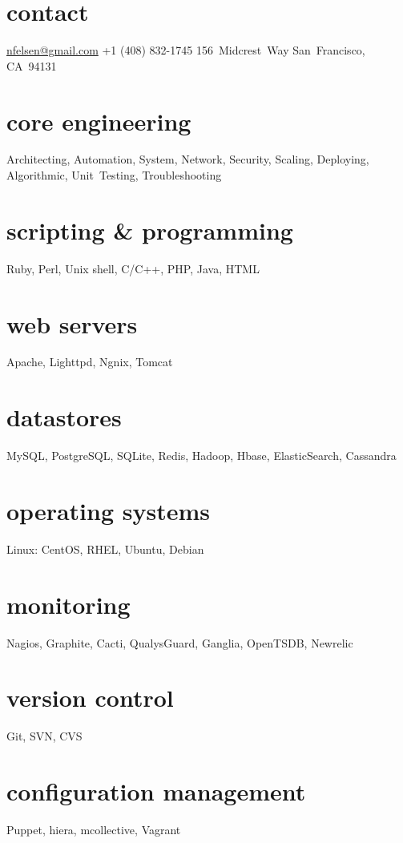 \documentclass[]{friggeri-cv} %
\begin{document}


\begin{aside} %
\section{contact}
\href{mailto:nfelsen@gmail.com}{nfelsen@gmail.com}
+1 (408) 832-1745
156~Midcrest~Way
San~Francisco, CA~94131
\section{core engineering}
Architecting, Automation, System, Network, Security, Scaling, Deploying, Algorithmic, Unit~Testing, Troubleshooting
\section{scripting \& programming}
Ruby, Perl, Unix shell, C/C++, PHP, Java, HTML
\section{web servers}
Apache, Lighttpd, Ngnix, Tomcat
\section{datastores}
MySQL, PostgreSQL, SQLite, Redis, Hadoop, Hbase, ElasticSearch, Cassandra
\section{operating systems}
Linux: CentOS, RHEL, Ubuntu, Debian
\section{monitoring}
Nagios, Graphite, Cacti, QualysGuard, Ganglia, OpenTSDB, Newrelic
\section{version control}
Git, SVN, CVS
\section{configuration management}
Puppet, hiera, mcollective, Vagrant
\end{aside}
\end{document}
